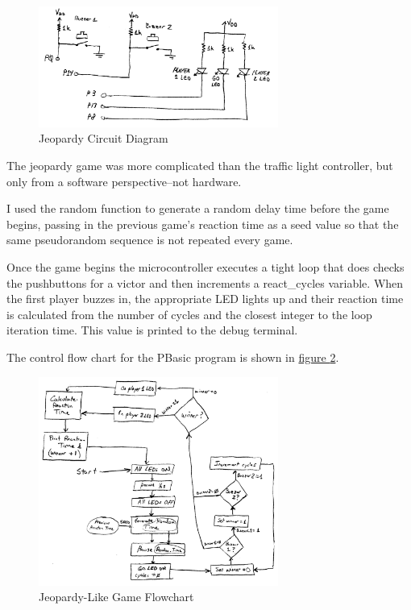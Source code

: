 \documentclass[11pt]{article}
\begin{document}
\begin{figure}[h!]
\centering
\includegraphics[width=0.7\textwidth]{jeopardy-circuit.pdf}
\caption{Jeopardy Circuit Diagram}
\label{jeopardy-circuit}
\end{figure}

The jeopardy game was more complicated than the traffic light controller,
but only from a software perspective--not hardware.

I used the random function to generate a random delay time before the game begins,
passing in the previous game's reaction time as a seed value so that the same
pseudorandom sequence is not repeated every game.

Once the game begins the microcontroller executes a tight loop that does checks the pushbuttons
for a victor and then increments a react\_cycles variable.
When the first player buzzes in, the appropriate LED lights up and their reaction
time is calculated from the number of cycles and the closest integer to the loop iteration time.
This value is printed to the debug terminal.

The control flow chart for the PBasic program is shown in \hyperref[jeopardy-flowchart]{figure \ref{jeopardy-flowchart}}.

\begin{figure}[ht]
\centering
\includegraphics[width=0.7\textwidth]{jeopardy-flowchart.pdf}
\caption{Jeopardy-Like Game Flowchart}
\label{jeopardy-flowchart}
\end{figure}
\end{document}
